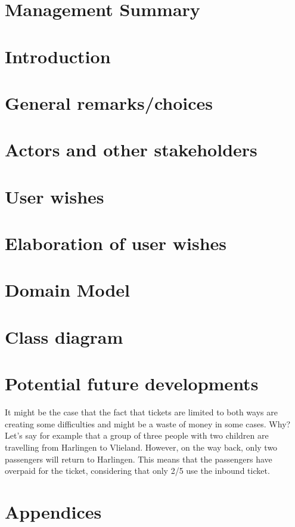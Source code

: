 \documentclass[11pt]{article}
\begin{document}
\tableofcontents
\newpage

\section{Management Summary}


\section{Introduction}


\section{General remarks/choices}

\newpage

\section{Actors and other stakeholders}


\section{User wishes}

\newpage

\section{Elaboration of user wishes}

\newpage

\section{Domain Model}

\newpage

\section{Class diagram}




\section{Potential future developments}
It might be the case that the fact that tickets are limited to both ways are creating some difficulties and might be a waste of money in some cases. Why? Let's say for example that a group of three people with two children are travelling from Harlingen to Vlieland. However, on the way back, only two passengers will return to Harlingen. This means that the passengers have overpaid for the ticket, considering that only 2/5 use the inbound ticket.
\section{Appendices}

\end{document}
